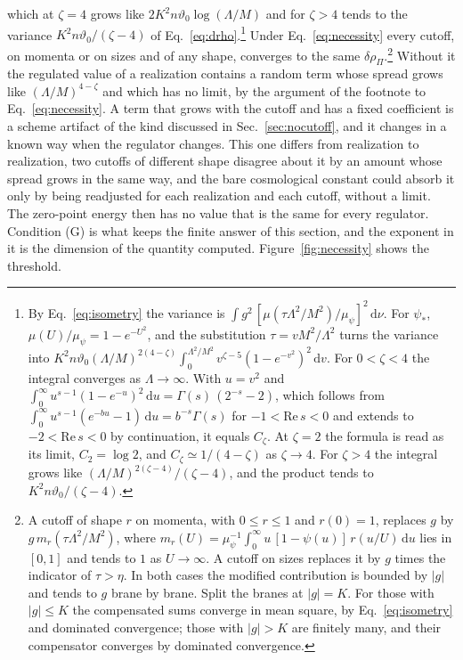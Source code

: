\documentclass[a4paper,11pt]{article}
\newcommand{\dd}{\mathrm{d}}
\begin{document}
which at $\zeta=4$ grows like $2K^2n\vartheta_0\log(\Lambda/M)$ and for $\zeta>4$ tends to the variance $K^2n\vartheta_0/(\zeta-4)$ of Eq.~\eqref{eq:drho}.\footnote{By Eq.~\eqref{eq:isometry} the variance is $\int g^2\,[\mu(\tau\Lambda^2/M^2)/\mu_\psi]^2\,\dd\nu$. For $\psi_*$, $\mu(U)/\mu_\psi=1-e^{-U^2}$, and the substitution $\tau=vM^2/\Lambda^2$ turns the variance into $K^2n\vartheta_0(\Lambda/M)^{2(4-\zeta)}\int_0^{\Lambda^2/M^2}v^{\zeta-5}(1-e^{-v^2})^2\,\dd v$. For $0<\zeta<4$ the integral converges as $\Lambda\to\infty$. With $u=v^2$ and $\int_0^\infty u^{s-1}(1-e^{-u})^2\,\dd u=\Gamma(s)\,(2^{-s}-2)$, which follows from $\int_0^\infty u^{s-1}(e^{-bu}-1)\,\dd u=b^{-s}\Gamma(s)$ for $-1<\mathrm{Re}\,s<0$ and extends to $-2<\mathrm{Re}\,s<0$ by continuation, it equals $C_\zeta$. At $\zeta=2$ the formula is read as its limit, $C_2=\log2$, and $C_\zeta\simeq1/(4-\zeta)$ as $\zeta\to4$. For $\zeta>4$ the integral grows like $(\Lambda/M)^{2(\zeta-4)}/(\zeta-4)$, and the product tends to $K^2n\vartheta_0/(\zeta-4)$.} Under Eq.~\eqref{eq:necessity} every cutoff, on momenta or on sizes and of any shape, converges to the same $\delta\rho_\Pi$.\footnote{A cutoff of shape $r$ on momenta, with $0\le r\le1$ and $r(0)=1$, replaces $g$ by $g\,m_r(\tau\Lambda^2/M^2)$, where $m_r(U)=\mu_\psi^{-1}\int_0^\infty u\,[1-\psi(u)]\,r(u/U)\,\dd u$ lies in $[0,1]$ and tends to $1$ as $U\to\infty$. A cutoff on sizes replaces it by $g$ times the indicator of $\tau>\eta$. In both cases the modified contribution is bounded by $|g|$ and tends to $g$ brane by brane. Split the branes at $|g|=K$. For those with $|g|\le K$ the compensated sums converge in mean square, by Eq.~\eqref{eq:isometry} and dominated convergence; those with $|g|>K$ are finitely many, and their compensator converges by dominated convergence.} Without it the regulated value of a realization contains a random term whose spread grows like $(\Lambda/M)^{4-\zeta}$ and which has no limit, by the argument of the footnote to Eq.~\eqref{eq:necessity}. A term that grows with the cutoff and has a fixed coefficient is a scheme artifact of the kind discussed in Sec.~\ref{sec:nocutoff}, and it changes in a known way when the regulator changes. This one differs from realization to realization, two cutoffs of different shape disagree about it by an amount whose spread grows in the same way, and the bare cosmological constant could absorb it only by being readjusted for each realization and each cutoff, without a limit. The zero-point energy then has no value that is the same for every regulator. Condition (G) is what keeps the finite answer of this section, and the exponent in it is the dimension of the quantity computed. Figure~\ref{fig:necessity} shows the threshold.
\end{document}
